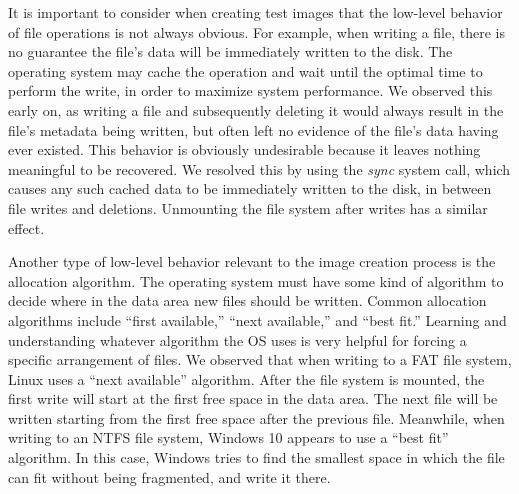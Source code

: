 \begin{paraphrase}
It is important to consider when creating test images that the low-level behavior of file operations is not always obvious. For example, when writing a file, there is no guarantee the file's data will be immediately written to the disk. The operating system may cache the operation and wait until the optimal time to perform the write, in order to maximize system performance. We observed this early on, as writing a file and subsequently deleting it would always result in the file's metadata being written, but often left no evidence of the file's data having ever existed. This behavior is obviously undesirable because it leaves nothing meaningful to be recovered. We resolved this by using the \emph{sync} system call, which causes any such cached data to be immediately written to the disk, in between file writes and deletions. Unmounting the file system after writes has a similar effect.

Another type of low-level behavior relevant to the image creation process is the allocation algorithm. The operating system must have some kind of algorithm to decide where in the data area new files should be written. Common allocation algorithms include ``first available,'' ``next available,'' and ``best fit.''
Learning and understanding whatever algorithm the OS uses is very helpful for forcing a specific arrangement of files. We observed that when writing to a FAT file system, Linux uses a ``next available'' algorithm. After the file system is mounted, the first write will start at the first free space in the data area. The next file will be written starting from the first free space after the previous file.
Meanwhile, when writing to an NTFS file system, Windows 10 appears to use a ``best fit'' algorithm. In this case, Windows tries to find the smallest space in which the file can fit without being fragmented, and write it there.
\end{paraphrase}

